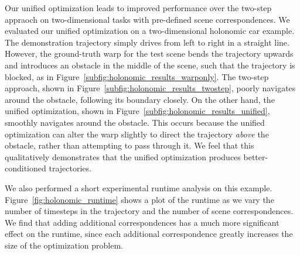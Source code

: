 Our unified optimization leads to improved performance over the two-step appraoch on two-dimensional tasks with pre-defined scene correspondences. We evaluated our unified optimization on a two-dimensional holonomic car example. The demonstration trajectory simply drives from left to right in a straight line. However, the ground-truth warp for the test scene bends the trajectory upwards and introduces an obstacle in the middle of the scene, such that the trajectory is blocked, as in Figure~\ref{subfig:holonomic_results_warponly}. The two-step approach, shown in Figure~\ref{subfig:holonomic_results_twostep}, poorly navigates around the obstacle, following its boundary closely. On the other hand, the unified optimization, shown in Figure~\ref{subfig:holonomic_results_unified}, smoothly navigates around the obstacle. This occurs because the unified optimization can alter the warp slightly to direct the trajectory \emph{above} the obstacle, rather than attempting to pass through it. We feel that this qualitatively demonstrates that the unified optimization produces better-conditioned trajectories.

We also performed a short experimental runtime analysis on this example. Figure~\ref{fig:holonomic_runtime} shows a plot of the runtime as we vary the number of timesteps in the trajectory and the number of scene correspondences. We find that adding additional correspondences has a much more significant effect on the runtime, since each additional correspondence greatly increases the size of the optimization problem.
